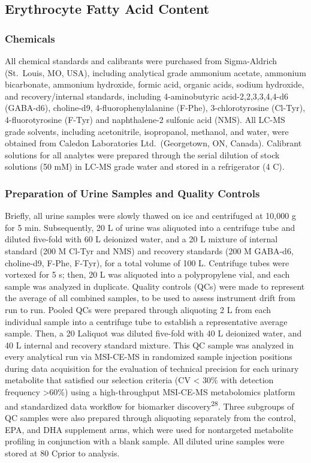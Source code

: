 \documentclass[journal=jacsat,manuscript=article]{achemso}
\begin{document}
\subsection{Erythrocyte Fatty Acid
Content}\label{erythrocyte-fatty-acid-content-1}

\subsubsection{Chemicals}\label{chemicals}

All chemical standards and calibrants were purchased from Sigma-Aldrich
(St.~Louis, MO, USA), including analytical grade ammonium acetate,
ammonium bicarbonate, ammonium hydroxide, formic acid, organic acids,
sodium hydroxide, and recovery/internal standards, including
4-aminobutyric acid-2,2,3,3,4,4-d6 (GABA-d6), choline-d9,
4-fluorophenylalanine (F-Phe), 3-chlorotyrosine (Cl-Tyr),
4-fluorotyrosine (F-Tyr) and naphthalene-2 sulfonic acid (NMS). All
LC-MS grade solvents, including acetonitrile, isopropanol, methanol, and
water, were obtained from Caledon Laboratories Ltd.~(Georgetown, ON,
Canada). Calibrant solutions for all analytes were prepared through the
serial dilution of stock solutions (50 mM) in LC-MS grade water and
stored in a refrigerator (4 C).

\subsubsection{Preparation of Urine Samples and Quality
Controls}\label{preparation-of-urine-samples-and-quality-controls}

Briefly, all urine samples were slowly thawed on ice and centrifuged at
10,000 g for 5 min. Subsequently, 20 L of urine was aliquoted into a
centrifuge tube and diluted five-fold with 60 L deionized water, and a
20 L mixture of internal standard (200 M Cl-Tyr and NMS) and recovery
standards (200 M GABA-d6, choline-d9, F-Phe, F-Tyr), for a total volume
of 100 L. Centrifuge tubes were vortexed for 5 s; then, 20 L was
aliquoted into a polypropylene vial, and each sample was analyzed in
duplicate. Quality controls (QCs) were made to represent the average of
all combined samples, to be used to assess instrument drift from run to
run. Pooled QCs were prepared through aliquoting 2 L from each
individual sample into a centrifuge tube to establish a representative
average sample. Then, a 20 Laliquot was diluted five-fold with 40 L
deionized water, and 40 L internal and recovery standard mixture. This
QC sample was analyzed in every analytical run via MSI-CE-MS in
randomized sample injection positions during data acquisition for the
evaluation of technical precision for each urinary metabolite that
satisfied our selection criteria (CV \textless{} 30\% with detection
frequency \textgreater60\%) using a high-throughput MSI-CE-MS
metabolomics platform and standardized data workflow for biomarker
discovery\textsuperscript{28}. Three subgroups of QC samples were also
prepared through aliquoting separately from the control, EPA, and DHA
supplement arms, which were used for nontargeted metabolite profiling in
conjunction with a blank sample. All diluted urine samples were stored
at 80 Cprior to analysis.
\end{document}
